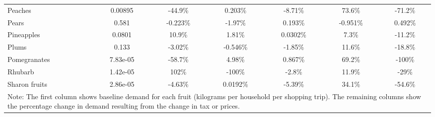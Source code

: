 \documentclass[11pt]{article}
\begin{document}
\begin{table}[h]
\begin{center}
{\begin{tabular}{lcccccc}
\hline
Peaches &0.00895 &-44.9\% &0.203\% &-8.71\% &73.6\% &-71.2\% \\
Pears &0.581 &-0.223\% &-1.97\% &0.193\% &-0.951\% &0.492\% \\
Pineapples &0.0801 &10.9\% &1.81\% &0.0302\% &7.3\% &-11.2\% \\
Plums &0.133 &-3.02\% &-0.546\% &-1.85\% &11.6\% &-18.8\% \\
Pomegranates &7.83e-05 &-58.7\% &4.98\% &0.867\% &69.2\% &-100\% \\
\hline
Rhubarb &1.42e-05 &102\% &-100\% &-2.8\% &11.9\% &-29\% \\
Sharon fruits &2.86e-05 &-4.63\% &0.0192\% &-5.39\% &34.1\% &-54.6\% \\
 \hline \hline
\multicolumn{7}{p{0.8 \textwidth}}{Note: The first column shows baseline demand for each fruit (kilograms per household per shopping trip). The remaining columns show the percentage change in demand resulting from the change in tax or prices.}
\end{tabular}}
\end{center}
\end{table}
\end{document}
